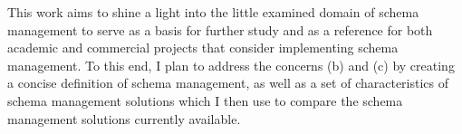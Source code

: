 This work aims to shine a light into the little examined domain of schema management to serve as a basis for further study and as a reference for both academic and commercial projects that consider implementing schema management.
To this end, I plan to address the concerns (b) and (c) by creating a concise definition of schema management, as well as a set of characteristics of schema management solutions which I then use to compare the schema management solutions currently available.
